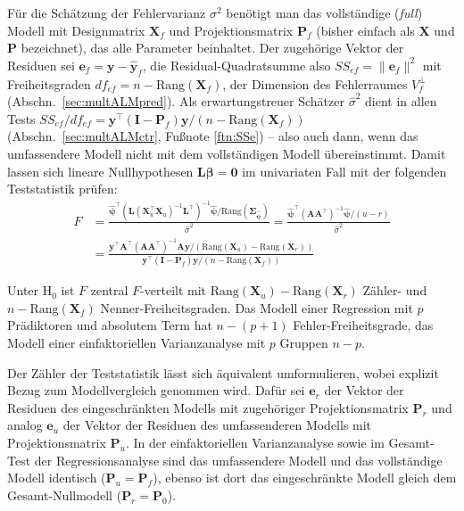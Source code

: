 Für die Schätzung der Fehlervarianz $\sigma^{2}$ benötigt man das vollständige (\emph{full}) Modell mit Designmatrix $\bm{X}_{f}$ und Projektionsmatrix $\bm{P}_{f}$ (bisher einfach als $\bm{X}$ und $\bm{P}$ bezeichnet), das alle Parameter beinhaltet. Der zugehörige Vektor der Residuen sei $\bm{e}_{f} = \bm{y} - \hat{\bm{y}}_{f}$, die Residual-Quadratsumme also $SS_{ef} = \|\bm{e}_{f}\|^{2}$ mit Freiheitsgraden $df_{ef} = n - \text{Rang}(\bm{X}_{f})$, der Dimension des Fehlerraumes $V_{f}^{\perp}$ (Abschn.\ \ref{sec:multALMpred}). Als erwartungstreuer Schätzer $\hat{\sigma}^{2}$ dient in allen Tests $SS_{ef} / df_{ef} = \bm{y}^{\top} (\bm{I} - \bm{P}_{f}) \bm{y} / (n - \text{Rang}(\bm{X}_{f}))$ (Abschn.\ \ref{sec:multALMctr}, Fußnote \ref{ftn:SSe}) -- also auch dann, wenn das umfassendere Modell nicht mit dem vollständigen Modell übereinstimmt. Damit lassen sich lineare Nullhypothesen $\bm{L} \bm{\beta} = \bm{0}$ im univariaten Fall mit der folgenden Teststatistik prüfen:
\begin{align*}
F &= \frac{\hat{\bm{\psi}}^{\top} (\bm{L} (\bm{X}_{u}^{\top} \bm{X}_{u})^{-1} \bm{L}^{\top})^{-1} \hat{\bm{\psi}} / \text{Rang}(\bm{\Sigma}_{\hat{\bm{\psi}}})}{\hat{\sigma}^{2}} = \frac{\hat{\bm{\psi}}^{\top} (\bm{A} \bm{A}^{\top})^{-1} \hat{\bm{\psi}} / (u - r)}{\hat{\sigma}^{2}}\\[2ex]
 &= \frac{\bm{y}^{\top} \bm{A}^{\top} (\bm{A} \bm{A}^{\top})^{-1} \bm{A} \bm{y} / (\text{Rang}(\bm{X}_{u}) - \text{Rang}(\bm{X}_{r}))}{\bm{y}^{\top} (\bm{I} - \bm{P}_{f}) \bm{y} / (n - \text{Rang}(\bm{X}_{f}))}
\end{align*}

Unter $\text{H}_{0}$ ist $F$ zentral $F$-verteilt mit $\text{Rang}(\bm{X}_{u}) - \text{Rang}(\bm{X}_{r})$ Zähler- und $n - \text{Rang}(\bm{X}_{f})$ Nenner-Freiheitsgraden. Das Modell einer Regression mit $p$ Prädiktoren und absolutem Term hat $n - (p+1)$ Fehler-Freiheitsgrade, das Modell einer einfaktoriellen Varianzanalyse mit $p$ Gruppen $n-p$.

Der Zähler der Teststatistik lässt sich äquivalent umformulieren, wobei explizit Bezug zum Modellvergleich genommen wird. Dafür sei $\bm{e}_{r}$ der Vektor der Residuen des eingeschränkten Modells mit zugehöriger Projektionsmatrix $\bm{P}_{r}$ und analog $\bm{e}_{u}$ der Vektor der Residuen des umfassenderen Modells mit Projektionsmatrix $\bm{P}_{u}$. In der einfaktoriellen Varianzanalyse sowie im Gesamt-Test der Regressionsanalyse sind das umfassendere Modell und das vollständige Modell identisch ($\bm{P}_{u} = \bm{P}_{f}$), ebenso ist dort das eingeschränkte Modell gleich dem Gesamt-Nullmodell ($\bm{P}_{r} = \bm{P}_{0}$).

